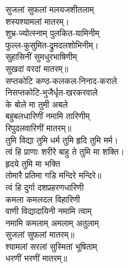 
\vspace{-0.3cm}
सुजलां सुफलां मलयजशीतलाम्\\
शस्यश्यामलां मातरम्।\\
शुभ्र-ज्योत्स्नाम् पुलकित-यामिनीम्\\
फुल्ल-कुसुमित-द्रुमदलशोभिनीम्।\\
सुहासिनीं सुमधुरभाषिणीम्\\
सुखदां वरदां मातरम्॥\\
सप्तकोटि कण्ठ-कलकल-निनाद-कराले\\
निसप्तकोटि-भुजैर्धृत-खरकरवाले\\
के बोले मा तुमी अबले\\
बहुबलधारिणीं नमामि तारिणीम्\\
रिपुदलवारिणीं मातरम्॥\\
तुमि विद्या तुमि धर्म तुमि हृदि तुमि मर्म।\\
त्वं हि प्राणाः शरीरे बाहु ते तुमि मा शक्ति।\\
हृदये तुमि मा भक्ति\\
तोमारै प्रतिमा गडि मन्दिरे मन्दिरे॥\\
त्वं हि दुर्गा दशप्रहरणधारिणी\\
कमला कमलदल विहारिणी\\
वाणी विद्यादायिनी नमामि त्वाम्\\
नमामि कमलाम् अमलाम् अतुलाम्\\
सुजलां सुफलां मातरम्॥\\
श्यामलां सरलां सुस्मितां भूषिताम्\\
धरणीं भरणीं मातरम्॥\\
